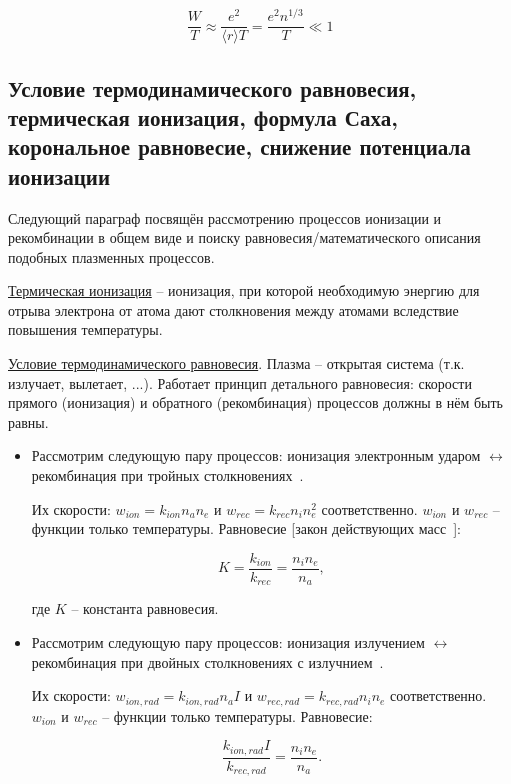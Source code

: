 \documentclass[10pt, a4paper]{article}
\begin{document}
\begin{equation}
	\frac{W}{T} \approx \frac{e^2}{\langle r \rangle T} = \frac{e^2 n^{1/3}}{T} \ll 1
\end{equation}

\subsection{Условие термодинамического равновесия, термическая ионизация, формула Саха, корональное равновесие, снижение потенциала ионизации}

Следующий параграф посвящён рассмотрению процессов ионизации и рекомбинации в общем виде и поиску равновесия/математического описания подобных плазменных процессов.

\uline{Термическая ионизация} -- ионизация, при которой необходимую энергию для отрыва электрона от атома дают столкновения между атомами вследствие повышения температуры.

\uline{Условие термодинамического равновесия}. Плазма -- открытая система (т.к. излучает, вылетает, ...). Работает принцип детального равновесия: скорости прямого (ионизация) и обратного (рекомбинация) процессов должны в нём быть равны.

\begin{itemize}

\item Рассмотрим следующую пару процессов: ионизация электронным ударом $\leftrightarrow$ рекомбинация при тройных столкновениях~\cite{frank}.

Их скорости: $w_{ion} = k_{ion}n_an_e$ и $w_{rec} = k_{rec}n_in_e^2$ соответственно. $w_{ion}$ и $w_{rec}$ -- функции только температуры. Равновесие [закон действующих масс~\cite{frank}]:
 
\begin{equation} \label{eq:detailed_balance}
	K = \frac{k_{ion}}{k_{rec}} = \frac{n_in_e}{n_a},
\end{equation}

где $K$ -- константа равновесия. 

\item Рассмотрим следующую пару процессов: ионизация излучением $\leftrightarrow$ рекомбинация при двойных столкновениях с излучнием~\cite{frank}.

Их скорости: $w_{ion, rad} = k_{ion, rad}n_aI$ и $w_{rec, rad} = k_{rec, rad}n_in_e$ соответственно. $w_{ion}$ и $w_{rec}$ -- функции только температуры. Равновесие:

\begin{equation}
	\frac{k_{ion, rad}I}{k_{rec, rad}} = \frac{n_in_e}{n_a}.
\end{equation} 

\end{itemize}
\end{document}
